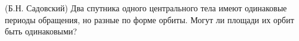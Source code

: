 (Б.Н. Садовский)
Два спутника одного центрального тела имеют одинаковые периоды обращения,
но разные по форме орбиты. Могут ли площади их орбит быть
одинаковыми?
